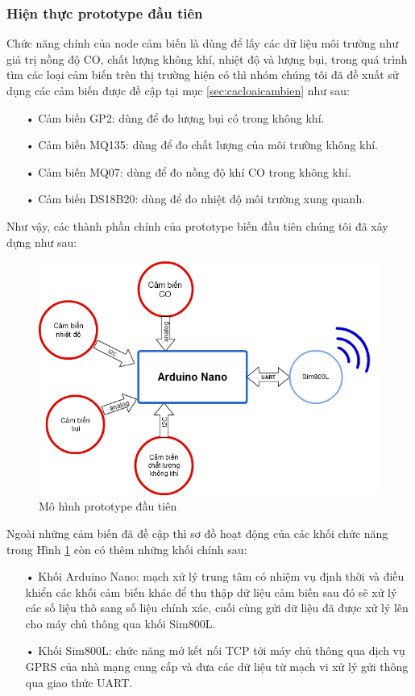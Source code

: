 \subsubsection*{Hiện thực prototype đầu tiên}
Chức năng chính của node cảm biến là dùng để lấy các dữ liệu môi trường như giá trị nồng độ CO, chất lượng không khí, nhiệt độ và lượng bụi, trong quá trình tìm các loại cảm biến trên thị trường hiện có thì nhóm chúng tôi đã đề xuất sử dụng các cảm biến được đề cập tại mục \ref{sec:cacloaicambien} như sau:
\begin{itemize}
\item[•]Cảm biến GP2: dùng để đo lượng bụi có trong không khí.
\item[•]Cảm  biến MQ135: dùng để đo chất lượng của môi trường không khí.
\item[•]Cảm biến MQ07: dùng để đo nồng độ khí CO trong không khí.
\item[•]Cảm biến DS18B20: dùng để đo nhiệt độ môi trường xung quanh. 
\end{itemize}
Như vậy, các thành phần chính của prototype biến đầu tiên chúng tôi đã xây dựng như sau:
\begin{figure}[H]
\centering    
\includegraphics[width=5in]{prototype_1}
\caption[Mô hình prototype đầu tiên]{Mô hình prototype đầu tiên}
\label{fig:prototype_1}
\end{figure}
Ngoài những cảm biến đã đề cập thì sơ đồ hoạt động của các khối chức năng trong Hình \ref{fig:prototype_1} còn có thêm những khối chính sau:
\begin{itemize}
\item[•] Khối Arduino Nano: mạch xử lý trung tâm có nhiệm vụ định thời và điều khiển các khối cảm biến khác để thu thập dữ liệu cảm biến sau đó sẽ xử lý các số liệu thô sang số liệu chính xác, cuối cùng gửi dữ liệu đã được xử lý lên cho máy chủ thông qua khối Sim800L.
\item[•] Khối Sim800L: chức năng mở kết nối TCP tới máy chủ thông qua dịch vụ GPRS của nhà mạng cung cấp và đưa các dữ liệu từ mạch vi xử lý gửi thông qua giao thức UART.
\end{itemize}


